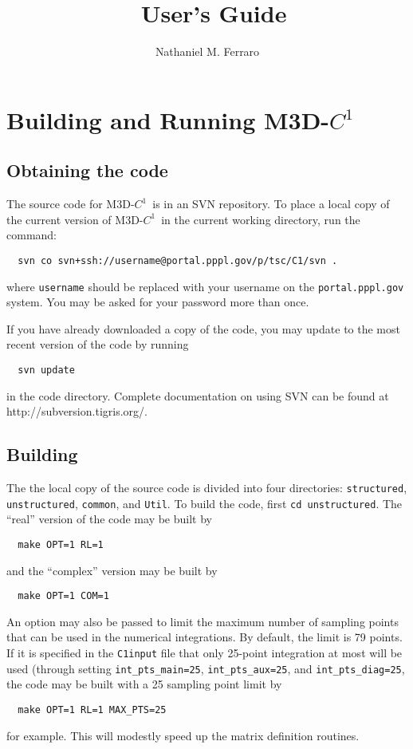 \documentclass[letterpaper]{book}
\title{\codename\ User's Guide}
\author{Nathaniel M. Ferraro}
\newcommand{\codename}{\textsc{M3D-$C^1$}}
\newcommand{\svnurl}{http://subversion.tigris.org/}
\begin{document}
\maketitle

\tableofcontents


\chapter{Building and Running \codename}

\section{Obtaining the code}

The source code for \codename\ is in an SVN repository.  To place a
local copy of the current version of \codename\ in the current working
directory, run the command:
\begin{verbatim}
  svn co svn+ssh://username@portal.pppl.gov/p/tsc/C1/svn .
\end{verbatim}
where \texttt{username} should be replaced with your username on the
\texttt{portal.pppl.gov} system.  You may be asked for your password
more than once.

If you have already downloaded a copy of the code, you may update to
the most recent version of the code by running
\begin{verbatim}
  svn update
\end{verbatim}
in the code directory.  Complete documentation on using SVN can be
found at \svnurl.

\section{Building}

The the local copy of the source code is divided into four
directories: \texttt{structured}, \texttt{unstructured},
\texttt{common}, and \texttt{Util}.  To build the code, first
\texttt{cd unstructured}.  The ``real'' version of the code may be
built by
\begin{verbatim}
  make OPT=1 RL=1
\end{verbatim}
and the ``complex'' version may be built by
\begin{verbatim}
  make OPT=1 COM=1
\end{verbatim}
An option may also be passed to limit the maximum number of sampling
points that can be used in the numerical integrations.  By default,
the limit is 79 points.  If it is specified in the \texttt{C1input}
file that only 25-point integration at most will be used (through
setting \texttt{int\_pts\_main=25}, \texttt{int\_pts\_aux=25}, and
\texttt{int\_pts\_diag=25}, the code may be built with a 25 sampling
point limit by 
\begin{verbatim}
  make OPT=1 RL=1 MAX_PTS=25
\end{verbatim}
for example.  This will modestly speed up the matrix definition
routines.
\end{document}
